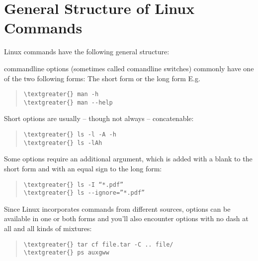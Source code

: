 \documentclass[letterpaper,10pt,english]{sphinxmanual}
\begin{document}
\section{General Structure of Linux Commands}
\label{introduction:general-structure-of-linux-commands}
Linux commands have the following general structure:
\begin{figure}[htbp]
\centering

\end{figure}

commandline options (sometimes called comandline switches) commonly have one of the two following forms: The short form  or the long form  E.g.
\begin{quote}

\begin{Verbatim}[commandchars=\\\{\}]
\textgreater{} man -h
\textgreater{} man --help
\end{Verbatim}
\end{quote}

Short options are usually – though not always – concatenable:
\begin{quote}

\begin{Verbatim}[commandchars=\\\{\}]
\textgreater{} ls -l -A -h
\textgreater{} ls -lAh
\end{Verbatim}
\end{quote}

Some options require an additional argument, which is added with a blank to the short form and with an equal sign to the long form:
\begin{quote}

\begin{Verbatim}[commandchars=\\\{\}]
\textgreater{} ls -I “*.pdf”
\textgreater{} ls --ignore=”*.pdf”
\end{Verbatim}
\end{quote}

Since Linux incorporates commands from different sources, options can be available in one or both forms and you’ll also encounter options with no dash at all and all kinds of mixtures:
\begin{quote}

\begin{Verbatim}[commandchars=\\\{\}]
\textgreater{} tar cf file.tar -C .. file/
\textgreater{} ps auxgww
\end{Verbatim}
\end{quote}
\end{document}
